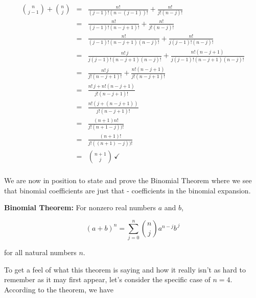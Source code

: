 \documentclass{ximera}
\begin{document}
\[ \begin{array}{rcl}

\displaystyle{\binom{n}{j-1} + \binom{n}{j}} & = & \frac{n!}{(j-1)! (n-(j-1))!} + \frac{n!}{j! (n-j)!}  \\  

& = & \frac{n!}{(j-1)! (n-j+1)!} + \frac{n!}{j! (n-j)!}  \\  

& = & \frac{n!}{(j-1)! (n-j+1)(n-j)!} + \frac{n!}{j(j-1)! (n-j)!}  \\  

& = & \frac{n! \, j}{j(j-1)! (n-j+1)(n-j)!} + \frac{n! (n-j+1)}{j(j-1)! (n-j+1)(n-j)!} \\  

& = & \frac{n! \, j}{j! (n-j+1)!} + \frac{n! (n-j+1)}{j! (n-j+1)!} \\  

& = & \frac{n! \, j + n! (n-j+1)}{j! (n-j+1)!} \\  

& = & \frac{n!\left( j + (n-j+1)\right)}{j! (n-j+1)!} \\  

& = & \frac{(n+1) n!}{j! (n+1-j))!} \\   

& = & \frac{(n+1)!} {j! ((n+1)-j))!} \\  

& = & \displaystyle{\binom{n+1}{j}} \, \checkmark \\ 

\end{array} \]

We are now in position to state and prove the Binomial Theorem where we see that binomial coefficients are just that - coefficients in the binomial expansion.

 


\begin{theorem}  \label{BinomialTheorem}  \textbf{Binomial Theorem:}  For nonzero real numbers $a$ and $b$,

\[(a+b)^{n} =\displaystyle{\sum_{j=0}^{n} \binom{n}{j} a^{n-j} b^{\, j}} \]

for all natural numbers $n$.

\end{theorem}


 

To get a feel of what this theorem is saying and how it really isn't as hard to remember as it may first appear, let's consider the specific case of $n=4$.  According to the theorem, we have
\end{document}
